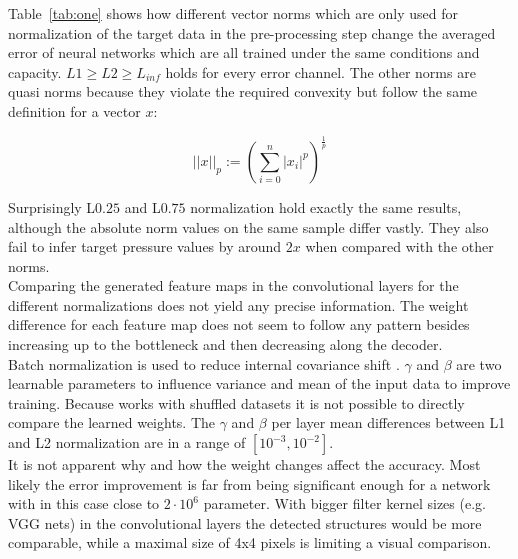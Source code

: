 \documentclass[acmtog]{techreportacmart}
\begin{document}
Table~\ref{tab:one} shows how different vector norms which are only used for normalization 
of the target data in the pre-processing step change the averaged error of neural networks 
which are all trained under the same conditions and capacity. 
$L1 \geq L2 \geq L_{inf}$ holds for every error channel. The other norms are quasi norms because they violate the required convexity 
but follow the same definition for a vector $x$:

\begin{equation}
\label{eqn:02}
||x||_p := {\left( \sum_{i=0}^{n} |x_i|^p \right)}^{\frac{1}{p}}
\end{equation}

Surprisingly L$0.25$ and L$0.75$ normalization hold exactly the same results, although the absolute 
norm values on the same sample differ vastly. They also fail to infer target pressure values by 
around $2x$ when compared with the other norms. \\
Comparing the generated feature maps in the convolutional layers for the different normalizations
does not yield any precise information. The weight difference for each feature map does not seem to
follow any pattern besides increasing up to the bottleneck and then decreasing along the decoder. \\
Batch normalization is used to reduce internal covariance shift \cite{ioffe2015}. 
$\gamma$ and $\beta$ are two learnable parameters to influence variance and mean of the 
input data to improve training. Because \cite{Thuerey20} works with shuffled datasets 
it is not possible to directly compare the learned weights. The $\gamma$ and $\beta$ 
per layer mean differences between L1 and L2 normalization are in a range of $[10^{-3}, 10^{-2}]$. \\ 
It is not apparent why and how the weight changes affect the accuracy. Most likely the error 
improvement is far from being significant enough for a network with in this case close to 
$2 \cdot 10^{6}$ parameter. With bigger filter kernel sizes (e.g. VGG nets) in the convolutional 
layers the detected structures would be more comparable, while a maximal size of 4x4 pixels is limiting a visual comparison.
\end{document}

